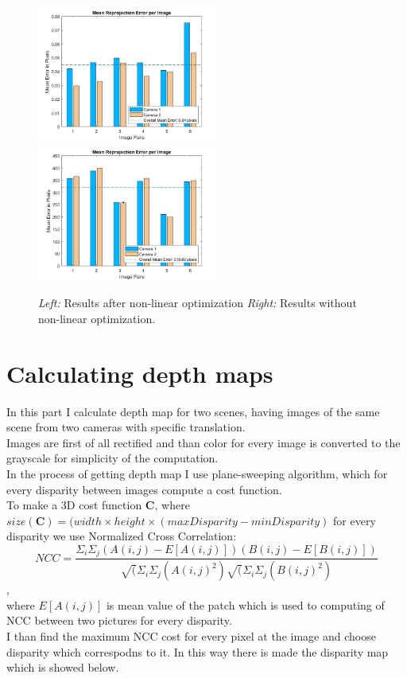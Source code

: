 \begin{figure}[h]
    \centering
    \includegraphics[width=6cm]{mean_repr_error_after_opt.jpg}
    \includegraphics[width=6cm]{mean_repr_error_before_opt.jpg}
    \caption{\emph{Left:} Results after non-linear optimization \emph{Right:} Results without non-linear optimization.}
    \label{fig:result1}
\end{figure}

\section*{Calculating depth maps}
In this part I calculate depth map for two scenes, having images of the same scene from two cameras with specific translation.\\
Images are first of all rectified and than color for every image is converted to the grayscale for simplicity of the computation.\\
In the process of getting depth map I use plane-sweeping algorithm, which for every disparity between images compute a cost function.\\
To make a 3D cost function $\mathbf{C}$, where $size(\mathbf{C})=(width \times height \times (maxDisparity-minDisparity)$ for every disparity we use Normalized Cross Correlation:
$$NCC = \frac{\Sigma_{i}\Sigma_{j}(A(i,j) - E[A(i,j)])(B(i,j)-E[B(i,j)])}
{\sqrt(\Sigma_{i}\Sigma_{j}(A(i,j)^2)\sqrt(\Sigma_{i}\Sigma_{j}(B(i,j)^2)}$$,\\
where $E[A(i,j)]$ is mean value of the patch which is used to computing of NCC between two pictures for every disparity.\\
I than find the maximum NCC cost for every pixel at the image and choose disparity which correspodns to it. In this way there is made the disparity map which is showed below.

